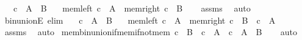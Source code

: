 \begin{isabellebody}
\ \ \ {\isachardoublequoteopen}c\ {\isasymin}\ A\ {\isasymunion}\ B{\isachardoublequoteclose}\isanewline
\ \ \ {\isacharparenleft}{\kern0pt}mem{\isacharunderscore}{\kern0pt}left{\isacharparenright}{\kern0pt}\ {\isachardoublequoteopen}c\ {\isasymin}\ A{\isachardoublequoteclose}\ {\isacharbar}{\kern0pt}\ {\isacharparenleft}{\kern0pt}mem{\isacharunderscore}{\kern0pt}right{\isacharparenright}{\kern0pt}\ {\isachardoublequoteopen}c\ {\isasymin}\ B{\isachardoublequoteclose}\isanewline
%
\isadelimproof
\ \ %
\endisadelimproof
%
\isatagproof
{}\isamarkupfalse%
\ assms\ \isamarkupfalse%
\ auto%
\endisatagproof
{\isafoldproof}%
%
\isadelimproof
\isanewline
%
\endisadelimproof
\isanewline
\isanewline
{}\isamarkupfalse%
\ bin{\isacharunderscore}{\kern0pt}unionE{\isacharprime}{\kern0pt}\ {\isacharbrackleft}{\kern0pt}elim{\isacharbang}{\kern0pt}{\isacharbrackright}{\kern0pt}{\isacharcolon}{\kern0pt}\isanewline
\ \ \ {\isachardoublequoteopen}c\ {\isasymin}\ A\ {\isasymunion}\ B{\isachardoublequoteclose}\isanewline
\ \ \ {\isacharparenleft}{\kern0pt}mem{\isacharunderscore}{\kern0pt}left{\isacharparenright}{\kern0pt}\ {\isachardoublequoteopen}c\ {\isasymin}\ A{\isachardoublequoteclose}\ {\isacharbar}{\kern0pt}\ {\isacharparenleft}{\kern0pt}mem{\isacharunderscore}{\kern0pt}right{\isacharparenright}{\kern0pt}\ {\isachardoublequoteopen}c\ {\isasymin}\ B{\isachardoublequoteclose}\ \ {\isachardoublequoteopen}c\ {\isasymnotin}\ A{\isachardoublequoteclose}\isanewline
%
\isadelimproof
\ \ %
\endisadelimproof
%
\isatagproof
{}\isamarkupfalse%
\ assms\ \isamarkupfalse%
\ auto%
\endisatagproof
{\isafoldproof}%
%
\isadelimproof
\isanewline
%
\endisadelimproof
\isanewline
\isanewline
{}\isamarkupfalse%
\ mem{\isacharunderscore}{\kern0pt}bin{\isacharunderscore}{\kern0pt}union{\isacharunderscore}{\kern0pt}if{\isacharunderscore}{\kern0pt}mem{\isacharunderscore}{\kern0pt}if{\isacharunderscore}{\kern0pt}not{\isacharunderscore}{\kern0pt}mem{\isacharcolon}{\kern0pt}\ {\isachardoublequoteopen}{\isacharparenleft}{\kern0pt}c\ {\isasymnotin}\ B\ {\isasymLongrightarrow}\ c\ {\isasymin}\ A{\isacharparenright}{\kern0pt}\ {\isasymLongrightarrow}\ c\ {\isasymin}\ A\ {\isasymunion}\ B{\isachardoublequoteclose}\isanewline
%
\isadelimproof
\ \ %
\endisadelimproof
%
\isatagproof
{}\isamarkupfalse%
\ auto%
\endisatagproof
{\isafoldproof}%
%
\isadelimproof
\isanewline
%
\endisadelimproof
\isanewline
{}\isamarkupfalse%

\end{isabellebody}
